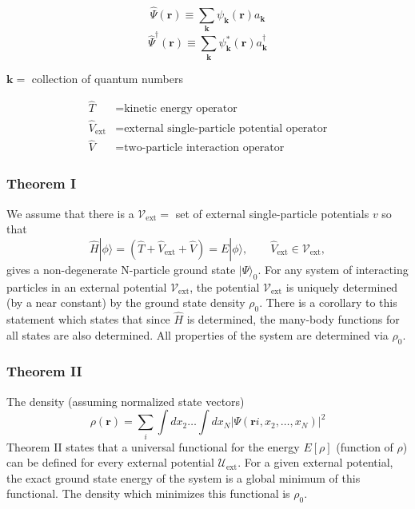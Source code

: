 \documentclass[compress]{beamer}
\newcommand*{\ket}[1]{|#1\rangle}
\begin{document}
\frame
{
  \frametitle{}
\begin{small}
{\scriptsize
  \begin{equation}
    \hat{\Psi}(\mathbf{r})\equiv \sum_{\mathbf{k}}\psi_{\mathbf{k}}(\mathbf{r})a_{\mathbf{k}} \nonumber
  \end{equation}
  \begin{equation}
    \hat{\Psi}^{\dagger }(\mathbf{r})\equiv \sum_{\mathbf{k}}\psi_{\mathbf{k}}^{*}(\mathbf{r})a_{\mathbf{k}}^{\dagger } \nonumber
  \end{equation}
\begin{center}
$\mathbf{k} = $ collection of quantum numbers
\end{center}

\begin{align}
  \hat{T} &= \text{kinetic energy operator} \nonumber \\
  \hat{V}_{\mathrm{ext}} &= \text{external single-particle potential operator} \nonumber \\
  \hat{V} &= \text{two-particle interaction operator} \nonumber
\end{align}
}
\end{small}
}

\frame
{
  \frametitle{Theorem I}
\begin{small}
{\scriptsize
We assume that there is a
$\mathcal{V}_{\mathrm{ext}} =$ set of external single-particle \alert{potentials} $v$ so that
\begin{equation}
\hat{H}\ket{\phi} = \left(\hat{T}+\hat{V}_{\mathrm{ext}}+\hat{V}\right)=E\ket{\phi},\qquad \hat{V}_{\mathrm{ext}}\in \mathcal{V}_{\mathrm{ext}},\nonumber
\end{equation} 
gives a \alert{non-degenerate} N-particle ground state $\ket{\Psi }_0$.
For any system of interacting particles in an external potential 
$\mathcal{V}_{\mathrm{ext}}$, the potential $\mathcal{V}_{\mathrm{ext}}$ is uniquely 
determined (by a near constant) by the ground state density $\rho_0$.
There is a corollary to this statement which states that since $\hat{H}$ is determined, the many-body functions for all states are also determined. All properties of the system are determined via $\rho_0$.
}
\end{small}
}


\frame
{
  \frametitle{Theorem II}
\begin{small}
{\scriptsize
The density (assuming normalized state vectors)
\begin{equation}
  \rho(\mathbf{r})=\sum_{i}\int dx_{2}\dots \int dx_{N}\vert \Psi(\mathbf{r}i,x_{2},\dots ,x_{N})\vert^{2} \nonumber
\end{equation}
Theorem II states that a universal functional for the energy $E[\rho]$ (function of $\rho$) can be defined for every external potential
$\mathcal{U}_{\mathrm{ext}}$. For a given external potential, the exact ground state energy of the system is a global minimum of this functional. The density which minimizes this functional is $\rho_0$.
}
\end{small}
}
\end{document}
